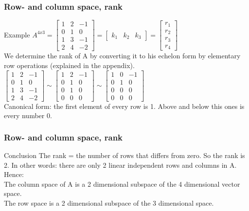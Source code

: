\begin{frame}
	\frametitle{Row- and column space, rank}
	\begin{block}{Example}
		$A^{4x3}=\begin{bmatrix} 1 & 2 & -1 \\ 0 & 1 & 0 \\ 1 & 3 & -1 \\ 2 & 4 & -2 \end{bmatrix}= \begin{bmatrix} k_1 & k_2 & k_3 \end{bmatrix}= \begin{bmatrix} r_1\\r_2\\r_3\\r_4
		\end{bmatrix}$ \\
		We determine the rank of A by converting it to his echelon form by elementary row operations (explained in the appendix).\\
		$\begin{bmatrix} 1 & 2 & -1 \\ 0 & 1 & 0 \\ 1 & 3 & -1 \\ 2 & 4 & -2 \end{bmatrix} \sim \begin{bmatrix} 1 & 2 & -1 \\ 0 & 1 & 0 \\ 0 & 1 & 0 \\ 0 & 0 & 0 \end{bmatrix} \sim \begin{bmatrix} 1 & 0 & -1 \\ 0 & 1 & 0 \\ 0 & 0 & 0 \\ 0 & 0 & 0 \end{bmatrix}$\\
		Canonical form: the first element of every row is 1. Above and below this ones is every number 0.
	\end{block}
\end{frame}

\begin{frame}
	\frametitle{Row- and column space, rank}
	\begin{block}{Conclusion}
		The rank = the number of rows that differs from zero. So the rank is 2. In other words: there are only 2 linear independent rows and columns in A. \\
		Hence:\\
		The column space of A is a 2 dimensional subspace of the 4 dimensional vector space.\\
		The row space is a 2 dimensional subspace of the 3 dimensional space.
	\end{block}
\end{frame}


